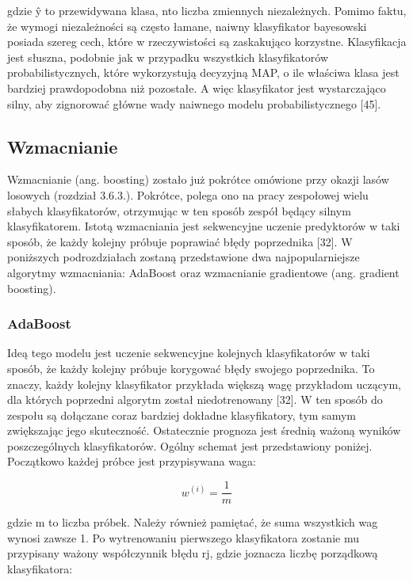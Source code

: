 gdzie ŷ to przewidywana klasa, nto liczba zmiennych niezależnych. Pomimo faktu, że wymogi niezależności są często łamane, naiwny klasyfikator bayesowski posiada szereg cech, które w rzeczywistości są zaskakująco korzystne. Klasyfikacja jest słuszna, podobnie jak w przypadku wszystkich klasyfikatorów probabilistycznych, które wykorzystują decyzyjną MAP, o ile właściwa klasa jest bardziej prawdopodobna niż pozostałe. A więc klasyfikator jest wystarczająco silny, aby zignorować główne wady naiwnego modelu probabilistycznego [45].

\subsection{Wzmacnianie}
\label{cha:Wzmacnianie}

Wzmacnianie (ang. boosting) zostało już pokrótce omówione przy okazji lasów losowych (rozdział 3.6.3.). Pokrótce, polega ono na pracy zespołowej wielu słabych klasyfikatorów, otrzymując w ten sposób zespół będący silnym klasyfikatorem. Istotą wzmacniania jest sekwencyjne uczenie predyktorów w taki sposób, że każdy kolejny próbuje poprawiać błędy poprzednika [32]. W poniższych podrozdziałach zostaną przedstawione dwa najpopularniejsze algorytmy wzmacniania: AdaBoost oraz wzmacnianie gradientowe (ang. gradient boosting). 

\subsubsection{AdaBoost}
\label{AdaBoost}

Ideą tego modelu jest uczenie sekwencyjne kolejnych klasyfikatorów w taki sposób, że każdy kolejny próbuje korygować błędy swojego poprzednika. To znaczy, każdy kolejny klasyfikator przykłada większą wagę przykładom uczącym, dla których poprzedni algorytm został niedotrenowany [32]. W ten sposób do zespołu są dołączane coraz bardziej dokładne klasyfikatory, tym samym zwiększając jego skuteczność. Ostatecznie prognoza jest średnią ważoną wyników poszczególnych klasyfikatorów. Ogólny schemat jest przedstawiony poniżej.
    Początkowo każdej próbce jest przypisywana waga:

\begin{equation}
w^{(i)}=\frac 1 m
\end{equation}

gdzie m to liczba próbek. Należy również pamiętać, że suma wszystkich wag wynosi zawsze 1. Po wytrenowaniu pierwszego klasyfikatora zostanie mu przypisany ważony współczynnik błędu rj, gdzie joznacza liczbę porządkową klasyfikatora:

